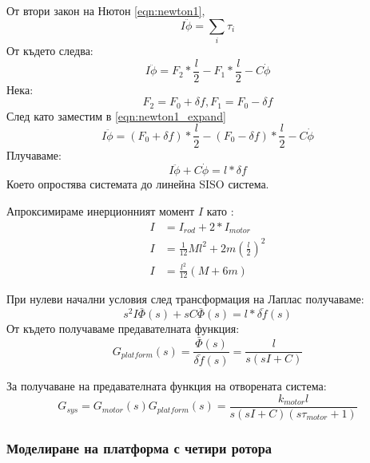 От втори закон на Нютон \autoref{eqn:newton1}, 
\begin{equation}
    I \ddot{\phi} = \sum_i \tau_i
    \label{eqn:newton1}
\end{equation}
От където следва:
\begin{equation}
    I \ddot{\phi} = F_2*\frac{l}{2} - F_1*\frac{l}{2} - C \dot{\phi}
    \label{eqn:newton1_expand}
\end{equation}
Нека:
\begin{equation}
    F_2 = F_0 + \delta f, F_1 = F_0 - \delta f 
\end{equation}
След като заместим в \autoref{eqn:newton1_expand}
\begin{equation}
    I \ddot{\phi} = (F_0 + \delta f)*\frac{l}{2} - (F_0 - \delta f)*\frac{l}{2} - C \dot{\phi}
\end{equation}
Плучаваме:
\begin{equation}
    I \ddot{\phi} + C \dot{\phi} = l * \delta f
\end{equation}
Което опростява системата до линейна SISO система.

Апроксимираме инерционният момент \(I\) като :
\begin{align}
    I &= I_{rod} + 2*I_{motor}\\
    I &= \frac{1}{12}Ml^2 + 2m(\frac{l}{2})^2 \\
    I &= \frac{l^2}{12}(M + 6m)
\end{align}

При нулеви начални условия след трансформация на Лаплас получаваме:
\begin{equation}
    s^2 I \bar{\Phi}(s) + s C \bar{\Phi}(s) = l * \bar{\delta f}(s) 
\end{equation}
От където получаваме предавателната функция:
\begin{equation}
    G_{platform}(s) = \frac{\bar{\Phi}(s)}{\bar{\delta f }(s)} = \frac{l}{s ( s I + C)}
\end{equation}

За получаване на предавателната функция на отворената система:
\begin{equation}
    G_{sys} = G_{motor}(s)G_{platform}(s) = 
    \frac{k_{motor} l}{s( s I + C)(s \tau_{motor} + 1)} 
\end{equation}


\subsubsection{Моделиране на платформа с четири ротора}

